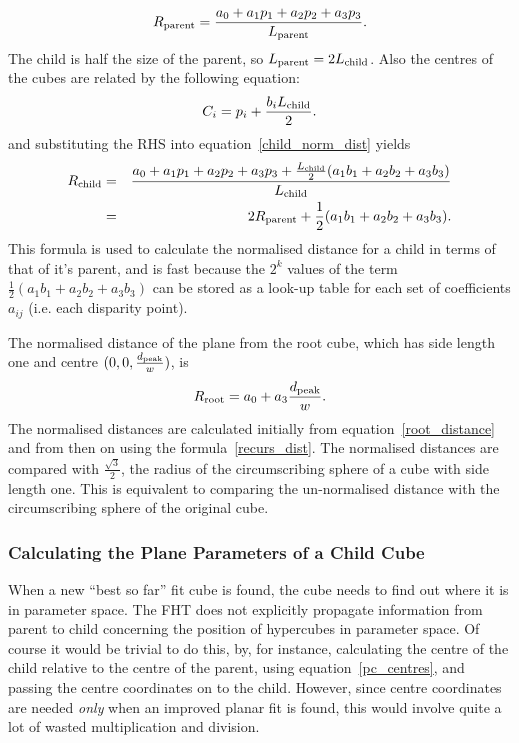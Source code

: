   \begin{displaymath}
     R_{\rm parent} = \frac{a_0 + a_1 p_1 + a_2 p_2 + a_3 p_3}{L_{\rm parent}}.
  \end{displaymath}
  The child is half the size of the parent, so
  $L_{\rm parent} = 2 L_{\rm child}$. Also the centres of the cubes are
  related by the following equation:
  \begin{equation}
     \label{pc_centres}
     C_i = p_i + \frac{b_i L_{\rm child}}{2}.
  \end{equation}
  and substituting the RHS into equation~\ref{child_norm_dist} yields
  \begin{eqnarray}
     R_{\rm child} & = & \frac{a_0 + a_1 p_1 + a_2 p_2 + a_3 p_3 +
		               \frac{L_{\rm child}}{2}
			       (a_1 b_1 + a_2 b_2 + a_3 b_3)}
			      {L_{\rm child}} \nonumber \\
     & = & 2 R_{\rm parent} + \frac{1}{2} (a_1 b_1 + a_2 b_2 + a_3 b_3) .
	\label{recurs_dist}
  \end{eqnarray}
  This \label{lookup_table} formula is used to calculate the normalised
  distance for a child in terms of that of it's parent, and is fast because
  the $2^k$ values of the term
  $\frac{1}{2} (a_1 b_1 + a_2 b_2 + a_3 b_3)$ can be stored as a look-up
  table for each set of coefficients $a_{ij}$ (i.e. each disparity point).

  The normalised distance of the plane from the root cube, which has side
  length one and centre $(0,0, \frac{d_{\rm peak}}{w})$, is
  \begin{equation}
     R_{\rm root} = a_0 + a_3 \frac{d_{\rm peak}}{w}.
     \label{root_distance}
  \end{equation}
  The normalised distances are calculated initially
  from equation~\ref{root_distance} and from
  then on using the formula~\ref{recurs_dist}.
  The normalised distances are compared with $\frac{\sqrt{3}}{2}$,
  the radius of the circumscribing sphere of a cube with side length one.
  This is equivalent to comparing the un-normalised distance with the
  circumscribing sphere of the original cube.

 \subsubsection{Calculating the Plane Parameters of a Child Cube}
  When a new ``best so far'' fit cube is found,
  the cube needs to find out where it is in parameter space.
  The FHT does not explicitly propagate information from parent to child
  concerning the position of hypercubes in parameter space.
  Of course it
  would be trivial to do this, by, for instance, calculating the centre
  of the child relative to the centre of the parent,
  using equation~\ref{pc_centres}, and passing
  the centre coordinates on to the child.
  However, since centre coordinates are needed {\em only} when an
  improved planar fit is found, this would involve quite a lot of wasted
  multiplication and division.

